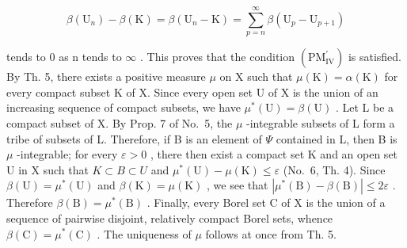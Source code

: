 \[
\beta (\mathrm{U} _ {n}) - \beta (\mathrm{K}) = \beta (\mathrm{U} _ {n} - \mathrm{K}) = \sum_ {p = n} ^ {\infty} \beta (\mathrm{U} _ {p} - \mathrm{U} _ {p + 1})
\]

tends to 0 as n tends to \(\infty\) . This proves that the condition \((\mathrm{PM}_{\mathrm{IV}}^{\prime})\) is satisfied. By Th. 5, there exists a positive measure \(\mu\) on X such that \(\mu(\mathrm{K}) = \alpha(\mathrm{K})\) for every compact subset K of X. Since every open set U of X is the union of an increasing sequence of compact subsets, we have \(\mu^{*}(\mathrm{U}) = \beta(\mathrm{U})\) . Let L be a compact subset of X. By Prop. 7 of No.~5, the \(\mu\) -integrable subsets of L form a tribe of subsets of L. Therefore, if B is an element of \(\Psi\) contained in L, then B is \(\mu\) -integrable; for every \(\varepsilon > 0\) , there then exist a compact set K and an open set U in X such that \(K \subset B \subset U\) and \(\mu^{*}(\mathrm{U}) - \mu(\mathrm{K}) \leqslant \varepsilon\) (No.~6, Th. 4). Since \(\beta(\mathrm{U}) = \mu^{*}(\mathrm{U})\) and \(\beta(\mathrm{K}) = \mu(\mathrm{K})\) , we see that \(|\mu^{*}(\mathrm{B}) - \beta(\mathrm{B})| \leqslant 2\varepsilon\) . Therefore \(\beta(\mathrm{B}) = \mu^{*}(\mathrm{B})\) . Finally, every Borel set C of X is the union of a sequence of pairwise disjoint, relatively compact Borel sets, whence \(\beta(\mathrm{C}) = \mu^{*}(\mathrm{C})\) . The uniqueness of \(\mu\) follows at once from Th. 5.

